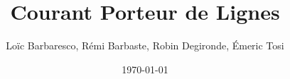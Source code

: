 \documentclass[a4paper,11pt]{article}
\title{Courant Porteur de Lignes}
\author{Loïc Barbaresco, Rémi Barbaste, Robin Degironde, Émeric Tosi}
\date{\today}
\begin{document}
    \maketitle{}
    \clearpage


    \setcounter{tocdepth}{2} %
    \renewcommand{\contentsname}{Sommaire} %
    \tableofcontents{} %
    \clearpage


    
    \clearpage

    

    \listoffigures
\end{document}
